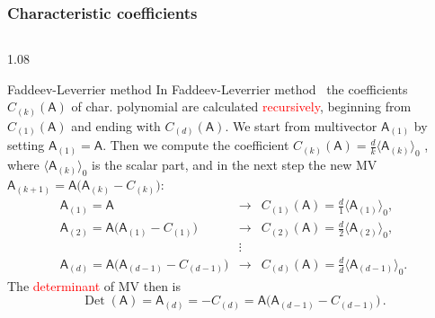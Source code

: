 \documentclass[xcolor=table,hyperref={pdfpagemode=FullScreen}]{beamer}
\def\m#1{\mathsf{#1}} %
\def\m#1{\mathsf{#1}}%
\DeclareMathOperator{\Det}{Det} %
\newcommand{\red}[1]{\textcolor{red}{#1}}
\begin{document}
\begin{frame}
\frametitle<presentation>{Characteristic coefficients}
\vskip -16pt
\begin{columns}[t]
\begin{column}{1.08\textwidth}
  \begin{block}{Faddeev-Leverrier method}
In Faddeev-Leverrier method~\cite{Householder1975,Hou1998,Shirokov2021,Helmstetter2019}
the coefficients $C_{(k)}(\m{A})$ of char. 
    polynomial are calculated \red{recursively},
beginning from $C_{(1)}(\m{A})$ and ending with $C_{(d)}(\m{A})$. We
start from multivector $\m{A}_{(1)}$ by setting
$\m{A}_{(1)}=\m{A}$. Then  we compute the coefficient
$C_{(k)}(\m{A})=\frac{d}{k}\langle \m{A}_{(k)} \rangle_{0}$ , where $\langle \m{A}_{(k)} \rangle_{0}$ is the scalar part, and in
the next step the new MV $\m{A}_{(k+1)}=\m{A}
\bigl(\m{A}_{(k)}-C_{(k)}\bigr)$:
\abovedisplayskip=12pt
\belowdisplayskip=12pt
\begin{equation*}\label{FLAlg}
  \begin{array}{rcl}
 \m{A}_{(1)}=\m{A}&\rightarrow&C_{(1)}(\m{A})=\frac{d}{1}\langle \m{A}_{(1)}\rangle_0,\\
 \m{A}_{(2)}=\m{A}\bigl(\m{A}_{(1)}-C_{(1)}\bigr)
&\rightarrow&C_{(2)}(\m{A})=\frac{d}{2}\langle \m{A}_{(2)}\rangle_0,\\
    &\vdots&\\
 \m{A}_{(d)}=\m{A}\bigl(\m{A}_{(d-1)}-C_{(d-1)}\bigr)
&\rightarrow&C_{(d)}(\m{A})=\frac{d}{d}\langle
\m{A}_{(d-1)}\rangle_0.
\end{array}
\end{equation*}
    The \red{determinant} of MV then is
\abovedisplayskip=6pt
\begin{equation*}
  \Det(\m{A})=\m{A}_{(d)}=-C_{(d)}=\m{A}
\bigl(\m{A}_{(d-1)}-C_{(d-1)}\bigr)\,.\end{equation*}
\end{block}
\end{column}
\end{columns}
\end{frame}
\end{document}
